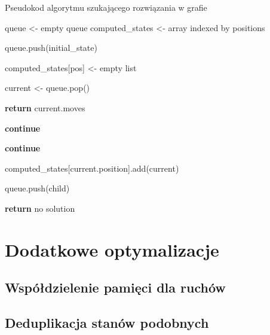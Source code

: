 \begin{algorithm}
    \caption{Pseudokod algorytmu szukającego rozwiązania w grafie}\label{algo:bfs}
    \begin{algorithmic}[1]
        \State queue <- empty queue
        \State computed\_states <- array indexed by positions
        \item[]
        \State queue.push(initial\_state)
        \item[]
        \State computed\_states[pos] <- empty list
        \EndFor
        \item[]

        \State current <- queue.pop()
        \item[]

        \State \textbf{return} current.moves
        \EndIf
        \item[]

        \State \textbf{continue}
        \EndIf
        \item[]

        \State \textbf{continue}
        \EndIf
        \item[]

        \State computed\_states[current.position].add(current)
        \item[]

        \State queue.push(child)
        \EndFor
        \EndWhile
        \item[]

        \State \textbf{return} no solution
        \EndProcedure
    \end{algorithmic}
\end{algorithm}


\section{Dodatkowe optymalizacje}

\subsection*{Współdzielenie pamięci dla ruchów}

\subsection*{Deduplikacja stanów podobnych}
